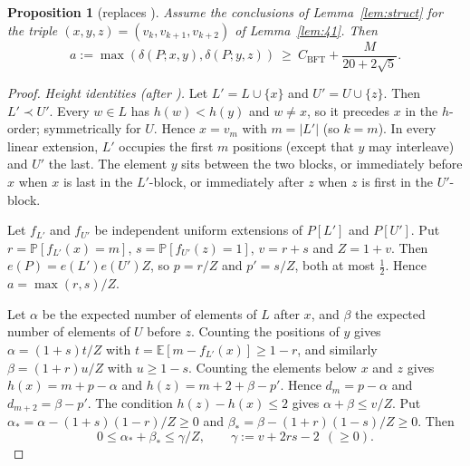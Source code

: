 \documentclass[10pt]{amsart}
\newtheorem{proposition}[theorem]{Proposition}
\theoremstyle{definition}
\theoremstyle{remark}
\newcommand{\PP}{\mathbb{P}}
\newcommand{\EE}{\mathbb{E}}
\newcommand{\CB}{C_{\mathrm{BFT}}}
\begin{document}
\begin{proposition}[replaces {\cite[Lemma~4.2]{KSBFT}}]\label{prop:C}
Assume the conclusions of Lemma~\ref{lem:struct} for the triple $(x,y,z)=(v_k,v_{k+1},v_{k+2})$ of Lemma~\ref{lem:41}. Then
\[
a:=\max(\delta(P;x,y),\delta(P;y,z))\ \ge\ \CB+\frac{M}{20+2\sqrt5}.
\]
\end{proposition}
\begin{proof}
\emph{Height identities (after \cite[(4.2)--(4.7)]{KSBFT}).}
Let $L'=L\cup\{x\}$ and $U'=U\cup\{z\}$. Then $L'\prec U'$.
Every $w\in L$ has $h(w)<h(y)$ and $w\ne x$, so it precedes $x$ in the $h$-order; symmetrically for $U$. Hence $x=v_m$ with $m=|L'|$ (so $k=m$).
In every linear extension, $L'$ occupies the first $m$ positions (except that $y$ may interleave) and $U'$ the last.
The element $y$ sits between the two blocks, or immediately before $x$ when $x$ is last in the $L'$-block, or immediately after $z$ when $z$ is first in the $U'$-block.

Let $f_{L'}$ and $f_{U'}$ be independent uniform extensions of $P[L']$ and $P[U']$. Put $r=\PP[f_{L'}(x)=m]$, $s=\PP[f_{U'}(z)=1]$, $v=r+s$ and $Z=1+v$.
Then $e(P)=e(L')e(U')Z$, so $p=r/Z$ and $p'=s/Z$, both at most $\frac12$. Hence $a=\max(r,s)/Z$.

Let $\alpha$ be the expected number of elements of $L$ after $x$, and $\beta$ the expected number of elements of $U$ before $z$.
Counting the positions of $y$ gives $\alpha=(1+s)t/Z$ with $t=\EE[m-f_{L'}(x)]\ge 1-r$, and similarly $\beta=(1+r)u/Z$ with $u\ge 1-s$.
Counting the elements below $x$ and $z$ gives $h(x)=m+p-\alpha$ and $h(z)=m+2+\beta-p'$.
Hence $d_m=p-\alpha$ and $d_{m+2}=\beta-p'$.
The condition $h(z)-h(x)\le2$ gives $\alpha+\beta\le v/Z$.
Put $\alpha_*=\alpha-(1+s)(1-r)/Z\ge0$ and $\beta_*=\beta-(1+r)(1-s)/Z\ge0$. Then
\[
0\le\alpha_*+\beta_*\le \gamma/Z,\qquad \gamma:=v+2rs-2\ \ (\ge 0).
\]


\end{proof}
\end{document}
